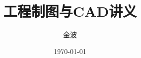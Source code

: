 \documentclass[12pt,twoside]{book}
\begin{document}
\begin{CJK}{UTF8}{song}

\title{\Huge 工程制图与CAD讲义}
\author{\Large 金波}
\date{\today}
\maketitle
\CJKtilde
\frontmatter
\tableofcontents
\mainmatter
\graphicspath{{cad/pdf/}{cad/png/}}







\backmatter
\printindex

\newpage
\end{CJK}
\end{document}

